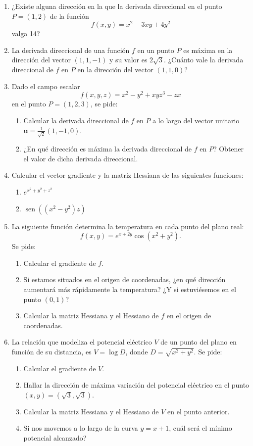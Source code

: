 \documentclass[a4paper,titlepage]{article}
\DeclareMathOperator{\sen}{sen}
\theoremstyle{solution}
\begin{document}
\begin{enumerate}[resume, leftmargin=*]
\item ¿Existe alguna dirección en la que la derivada direccional en el punto $P=(1,2)$ de la función 
\[
f(x,y) = x^2-3xy+4y^2
\]
valga 14?

\item La derivada direccional de una función $f$ en un punto $P$ es máxima en la dirección del vector $(1,1,-1)$ y su valor es $2\sqrt{3}$.
¿Cuánto vale la derivada direccional de $f$ en $P$ en la dirección del vector $(1,1,0)$?

\item Dado el campo escalar 
\[
f(x,y,z) = x^2-y^2+xyz^3-zx
\]
en el punto $P=(1,2,3)$, se pide:
\begin{enumerate}
\item Calcular la derivada direccional de $f$ en $P$ a lo largo del vector unitario $\mathbf{u}=\frac{1}{\sqrt2}(1,-1,0)$.
\item ¿En qué dirección es máxima la derivada direccional de $f$ en $P$? Obtener el valor de dicha derivada direccional.
\end{enumerate} 

\item Calcular el vector gradiente y la matriz Hessiana de las siguientes funciones:
\begin{multicols}{2}
\begin{enumerate}
\item $e^{x^2+y^2+z^2}$
\item $\sen((x^2-y^2)z)$
\end{enumerate}
\end{multicols}

\item La siguiente función determina la temperatura en cada punto del plano real:
\[
f(x,y)=e^{x+2y}\cos(x^2+y^2).
\]
Se pide:
\begin{enumerate}
\item Calcular el gradiente de $f$.
\item Si estamos situados en el origen de coordenadas, ¿en qué dirección aumentará más rápidamente la temperatura? ¿Y si estuviésemos en el punto $(0,1)$?
\item Calcular la matriz Hessiana y el Hessiano de $f$ en el origen de coordenadas.
\end{enumerate}

\item La relación que modeliza el potencial eléctrico $V$ de un punto del plano en función de su distancia, es $V=\log D$, donde $D=\sqrt{x^2+y^2}$.
Se pide:
\begin{enumerate}
\item Calcular el gradiente de $V$.
\item Hallar la dirección de máxima variación del potencial eléctrico en el punto $(x,y)=(\sqrt{3},\sqrt{3})$.
\item Calcular la matriz Hessiana y el Hessiano de $V$ en el punto anterior.
\item Si nos movemos a lo largo de la curva $y=x+1$, cuál será el mínimo potencial alcanzado?
\end{enumerate}


\end{enumerate}
\end{document}
